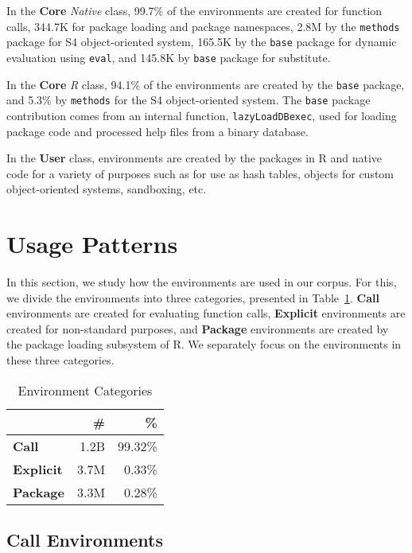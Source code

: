 \documentclass[10pt,review,sigplan,authorversion=true]{acmart}
\newcommand{\code}[1]{\lstinline |#1|\xspace}
\begin{document}
In the \textbf{Core} \emph{Native} class, 99.7\% of the environments are created
for function calls, 344.7K for package loading and package namespaces, 2.8M by
the \code{methods} package for S4 object-oriented system, 165.5K by the
\code{base} package for dynamic evaluation using \code{eval}, and 145.8K by
\code{base} package for substitute.

In the \textbf{Core} \emph{R} class, 94.1\% of the environments are created by
the \code{base} package, and 5.3\% by \code{methods} for the S4 object-oriented
system. The \code{base} package contribution comes from an internal function,
\code{lazyLoadDBexec}, used for loading package code and processed help files
from a binary database.

In the \textbf{User} class, environments are created by the packages in R and
native code for a variety of purposes such as for use as hash tables, objects
for custom object-oriented systems, sandboxing, etc.


\section{Usage Patterns}

In this section, we study how the environments are used in our corpus. For this,
we divide the environments into three categories, presented in
Table~\ref{table:env_category}. \textbf{Call} environments are created for
evaluating function calls, \textbf{Explicit} environments are created for
non-standard purposes, and \textbf{Package} environments are created by the
package loading subsystem of R. We separately focus on the environments in these
three categories.

\begin{table}[!h]
  \vspace{-3mm} \small
  \caption{Environment Categories} \label{table:env_category}
  \centering
  \begin{tabular}{lrr}
    \toprule
    &\textbf{\#}&\textbf{\%}\\
    \midrule
    \textbf{Call}&1.2B&99.32\%\\
    \textbf{Explicit}&3.7M&0.33\%\\
    \textbf{Package}&3.3M&0.28\%\\
    \bottomrule
  \end{tabular}
\end{table}


\subsection{Call Environments}
\end{document}

